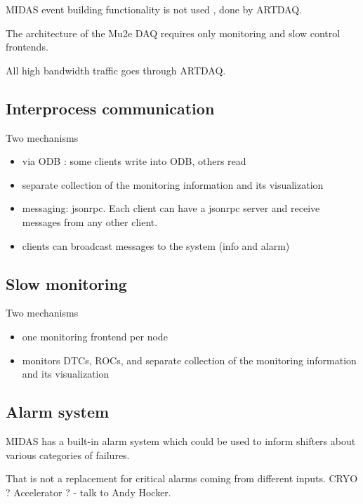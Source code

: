MIDAS event building functionality is not used , done by ARTDAQ.

The architecture of the Mu2e DAQ requires only monitoring and slow control frontends.

All high bandwidth traffic goes through ARTDAQ.

\subsection{Interprocess communication} 

Two mechanisms
\begin{itemize}
\item
  via ODB : some clients write into ODB, others read
\item
  separate collection of the monitoring information and its visualization
\item
  messaging: jsonrpc. Each client can have a jsonrpc server and receive messages
  from any other client.
\item
  clients can broadcast messages to the system (info and alarm)
\end{itemize}

\subsection{Slow monitoring} 

Two mechanisms
\begin{itemize}
\item
  one monitoring frontend per node 
\item
  monitors DTCs, ROCs, and separate collection of the monitoring information and its visualization
\end{itemize}

\subsection{Alarm system}

MIDAS has a built-in alarm system which could be used to inform shifters
about various categories of failures.

That is not a replacement for critical alarms coming from different inputs.
CRYO ? Accelerator ? - talk to Andy Hocker.



